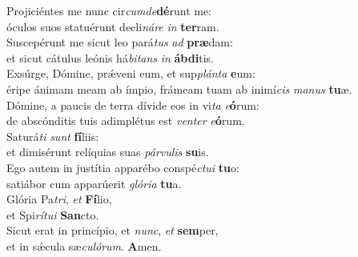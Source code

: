 \evenverse Projiciéntes me nunc cir\textit{cum}\textit{de}\textbf{dé}runt me:~\*\\
\evenverse óculos suos statuérunt decli\textit{ná}\textit{re} \textit{in} \textbf{ter}ram.\\
\oddverse Suscepérunt me sicut leo pará\textit{tus} \textit{ad} \textbf{præ}dam:~\*\\
\oddverse et sicut cátulus leónis há\textit{bi}\textit{tans} \textit{in} \textbf{áb}\textbf{di}tis.\\
\evenverse Exsúrge, Dómine, prǽveni eum, et sup\textit{plán}\textit{ta} \textbf{e}um:~\*\\
\evenverse éripe ánimam meam ab ímpio, frámeam tuam ab inimí\textit{cis} \textit{ma}\textit{nus} \textbf{tu}æ.\\
\oddverse Dómine, a paucis de terra dívide eos in vi\textit{ta} \textit{e}\textbf{ó}rum:~\*\\
\oddverse de abscónditis tuis adimplétus est \textit{ven}\textit{ter} \textit{e}\textbf{ó}rum.\\
\evenverse Saturá\textit{ti} \textit{sunt} \textbf{fí}liis:~\*\\
\evenverse et dimisérunt relíquias suas \textit{pár}\textit{vu}\textit{lis} \textbf{su}is.\\
\oddverse Ego autem in justítia apparébo conspé\textit{ctu}\textit{i} \textbf{tu}o:~\*\\
\oddverse satiábor cum apparúerit \textit{gló}\textit{ri}\textit{a} \textbf{tu}a.\\
\evenverse Glória Pa\textit{tri}, \textit{et} \textbf{Fí}lio,~\*\\
\evenverse et Spi\textit{rí}\textit{tu}\textit{i} \textbf{San}cto.\\
\oddverse Sicut erat in princípio, et \textit{nunc}, \textit{et} \textbf{sem}per,~\*\\
\oddverse et in sǽcula sæ\textit{cu}\textit{ló}\textit{rum}. \textbf{A}men.\\
